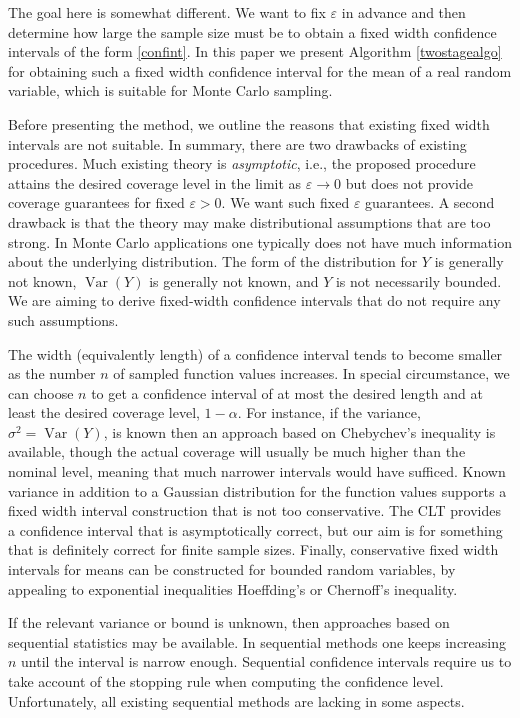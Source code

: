 \documentclass[graybox]{svmult}
\DeclareMathOperator{\var}{Var}
\begin{document}
The goal here is somewhat different.  We want to fix $\varepsilon$ in advance and then determine how large the sample size must be to obtain a fixed
width confidence intervals of the form \eqref{confint}. In this paper we present Algorithm \ref{twostagealgo} for obtaining such a fixed width
confidence interval for the mean of a real random
variable, which is suitable for Monte Carlo sampling.

Before presenting the method, we outline the reasons
that existing fixed width intervals are not suitable.  In summary, there are two drawbacks of existing procedures.  Much existing theory is \emph{asymptotic}, i.e., the proposed procedure attains the desired coverage level in the limit as $\varepsilon\to 0$ but does not provide
coverage guarantees for fixed $\varepsilon>0$.  We want such fixed $\varepsilon$ guarantees.  A second drawback is that the theory may make distributional assumptions that are too strong.  In Monte Carlo applications one typically does not have much information about the underlying distribution.  The form of the distribution for $Y$ is generally not known, $\var(Y)$ is generally not known, and $Y$ is not necessarily bounded. We are aiming to derive fixed-width confidence intervals that do not require any such assumptions.  

The width (equivalently length) of a confidence interval
tends to become smaller as the number $n$ of sampled
function values increases. In special circumstance, we can choose $n$ to get
a confidence interval of at most the desired length and at
least the desired coverage level, $1-\alpha$. For instance, if the variance, $\sigma^2=\var(Y)$, is known then an approach based on Chebychev's
inequality is available, though the actual coverage
will usually be much higher than the nominal level,
meaning that much narrower intervals would have sufficed.
Known variance in addition to a Gaussian distribution for the function values
supports a fixed width interval construction that
is not too conservative. The CLT provides a confidence interval that is asymptotically correct, but our aim is for something that is definitely correct for finite sample sizes.
Finally, conservative fixed width intervals
for means can be constructed for bounded random variables, by appealing
to exponential inequalities Hoeffding's or Chernoff's inequality.

If the relevant variance or bound is unknown, then approaches
based on sequential statistics \citep{Sie85a}
may be available.  In sequential methods one keeps increasing
$n$ until the interval is narrow enough. Sequential
confidence intervals require us to take account of the
stopping rule when computing the confidence level. Unfortunately, all existing sequential methods are lacking in some aspects. 
\end{document}
